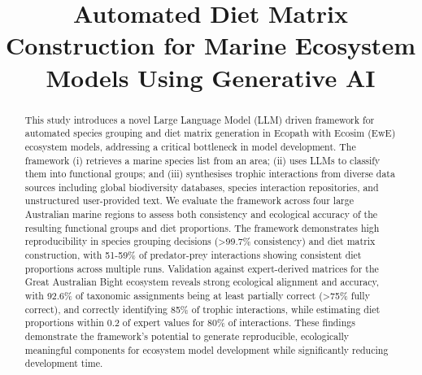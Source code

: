 \documentclass[12pt,a4paper]{article}
\title{Automated Diet Matrix Construction for Marine Ecosystem Models Using Generative AI}
\date{}  %
\begin{document}
\linenumbers
\maketitle

\begin{abstract}
This study introduces a novel Large Language Model (LLM) driven framework for automated species grouping and diet matrix generation in Ecopath with Ecosim (EwE) ecosystem models, addressing a critical bottleneck in model development. The framework (i) retrieves a marine species list from an area; (ii) uses LLMs to classify them into functional groups; and (iii) synthesises trophic interactions from diverse data sources including global biodiversity databases, species interaction repositories, and unstructured user-provided text. We evaluate the framework across four large Australian marine regions to assess both consistency and ecological accuracy of the resulting functional groups and diet proportions. The framework demonstrates high reproducibility in species grouping decisions (>99.7\% consistency) and diet matrix construction, with 51-59\% of predator-prey interactions showing consistent diet proportions across multiple runs. Validation against expert-derived matrices for the Great Australian Bight ecosystem reveals strong ecological alignment and accuracy, with 92.6\% of taxonomic assignments being at least partially correct (>75\% fully correct), and correctly identifying 85\% of trophic interactions, while estimating diet proportions within 0.2 of expert values for 80\% of interactions. These findings demonstrate the framework's potential to generate reproducible, ecologically meaningful components for ecosystem model development while significantly reducing development time.
\end{abstract}









\clearpage

\end{document}
